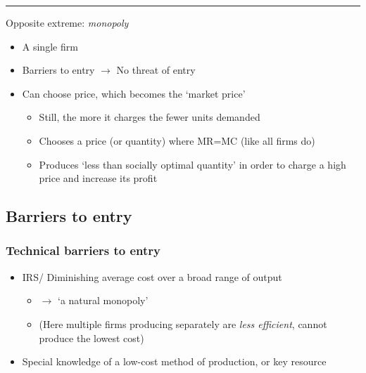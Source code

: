 \documentclass[]{article}
\providecommand{\tightlist}{%
  \setlength{\itemsep}{0pt}\setlength{\parskip}{0pt}}
\begin{document}
\begin{center}\rule{0.5\linewidth}{\linethickness}\end{center}

Opposite extreme: \emph{monopoly}

\begin{itemize}
\item
  A single firm
\item
  Barriers to entry \(\rightarrow\) No threat of entry
\item
  Can choose price, which becomes the `market price'

  \begin{itemize}
  \item
    Still, the more it charges the fewer units demanded
  \item
    Chooses a price (or quantity) where MR=MC (like all firms do)
  \item
    Produces `less than socially optimal quantity' in order to charge a high price and increase its profit
  \end{itemize}
\end{itemize}

\hypertarget{barriers-to-entry}{%
\subsection{Barriers to entry}\label{barriers-to-entry}}

\hypertarget{technical-barriers-to-entry}{%
\subsubsection{Technical barriers to entry}\label{technical-barriers-to-entry}}

\begin{itemize}
\tightlist
\item
  IRS/ Diminishing average cost over a broad range of output

  \begin{itemize}
  \tightlist
  \item
    \(\rightarrow\) `a natural monopoly'
  \item
    (Here multiple firms producing separately are \emph{less efficient}, cannot produce the lowest cost)
  \end{itemize}
\item
  Special knowledge of a low-cost method of production, or key resource
\end{itemize}
\end{document}
